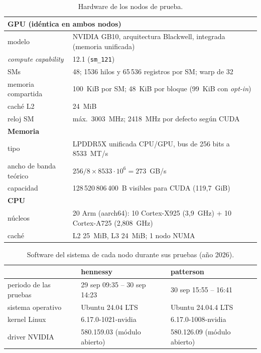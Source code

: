 \begin{table}[htbp]
  \centering\small
  \begin{tabularx}{\linewidth}{lX}
    \toprule
    \multicolumn{2}{l}{\textbf{GPU} (idéntica en ambos nodos)} \\
    \midrule
    modelo & NVIDIA GB10, arquitectura Blackwell, integrada (memoria unificada) \\
    \emph{compute capability} & 12.1 (\texttt{sm\_121}) \\
    SMs & 48; 1536 hilos y 65\,536 registros por SM; warp de 32 \\
    memoria compartida & 100~KiB por SM; 48~KiB por bloque (99~KiB con \emph{opt-in}) \\
    caché L2 & 24~MiB \\
    reloj SM & máx.\ 3003~MHz; 2418~MHz por defecto según CUDA \\
    \midrule
    \multicolumn{2}{l}{\textbf{Memoria}} \\
    \midrule
    tipo & LPDDR5X unificada CPU/GPU, bus de 256 bits a 8533~MT/s \\
    ancho de banda teórico & $256/8 \times 8533\cdot 10^6 = 273$~GB/s \\
    capacidad & 128\,520\,806\,400~B visibles para CUDA (119,7~GiB) \\
    \midrule
    \multicolumn{2}{l}{\textbf{CPU}} \\
    \midrule
    núcleos & 20 Arm (aarch64): 10 Cortex-X925 (3,9~GHz) + 10 Cortex-A725 (2,808~GHz) \\
    caché & L2 25~MiB, L3 24~MiB; 1 nodo NUMA \\
    \bottomrule
  \end{tabularx}
  \caption{Hardware de los nodos de prueba.}
  \label{tab:hardware}
\end{table}

\begin{table}[htbp]
  \centering\small
  \begin{tabularx}{\linewidth}{lXX}
    \toprule
    & hennessy & patterson \\
    \midrule
    periodo de las pruebas & 29 sep 09:35 -- 30 sep 14:23 & 30 sep 15:55 -- 16:41 \\
    sistema operativo & Ubuntu 24.04 LTS & Ubuntu 24.04.4 LTS \\
    kernel Linux & 6.17.0-1021-nvidia & 6.17.0-1008-nvidia \\
    driver NVIDIA & 580.159.03 (módulo abierto) & 580.126.09 (módulo abierto) \\
    \bottomrule
  \end{tabularx}
  \caption{Software del sistema de cada nodo durante sus pruebas (año 2026).}
  \label{tab:sistema}
\end{table}

